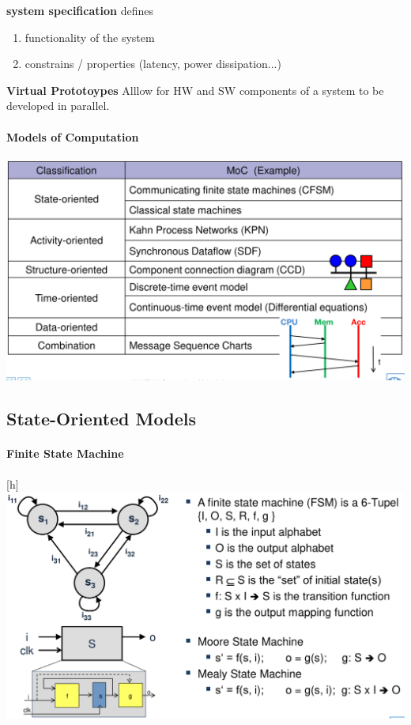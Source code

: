\documentclass[english]{latex4ei/latex4ei_sheet}
\begin{document}
\textbf{system specification} defines
\begin{enumerate}
	\item functionality of the system
	\item constrains / properties (latency, power dissipation...)
\end{enumerate}

\textbf{Virtual Prototoypes} Alllow for HW and SW components of a system to be developed in parallel.

\paragraph{Models of Computation}

\begin{center}
  \includegraphics[width=0.8\linewidth]{assets/ModelsOfComputation.png}
\end{center}

\subsection{State-Oriented Models}

\paragraph{Finite State Machine}

\begin{center}[h]
  \includegraphics[width=0.8\linewidth]{assets/FiniteStateMachine.png}
  \label{fig:finitestatemachine}
\end{center}
\end{document}
